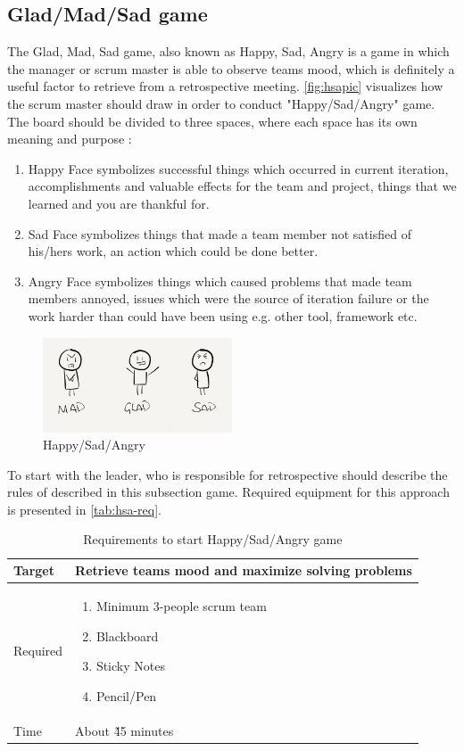 \subsection{Glad/Mad/Sad game}
\label{subch:gmsGame}
The Glad, Mad, Sad game, also known as Happy, Sad, Angry is a game in which the manager or scrum master is able to observe teams mood, which is definitely a useful factor to retrieve from a retrospective meeting. \autoref{fig:hsapic} visualizes how the scrum master should draw in order to conduct "Happy/Sad/Angry" game. The board should be divided to three spaces, where each space has its own meaning and purpose \cite{HSABibliography}:
\begin{enumerate}
    \item Happy Face symbolizes successful things which occurred in current iteration, accomplishments and valuable effects for the team and project, things that we learned and you are thankful for.
    \item Sad Face symbolizes things that made a team member not satisfied of his/hers work, an action which could be done better.
    \item Angry Face symbolizes things which caused problems that made team members annoyed, issues which were the source of iteration failure or the work harder than could have been using e.g. other tool, framework etc.
\end{enumerate}
\begin{figure}[h]
\caption{Happy/Sad/Angry}
\label{fig:hsapic}
\centering
\includegraphics[width=0.5\textwidth]{img/mgs}
\end{figure}

To start with the leader, who is responsible for retrospective should describe the rules of described in this subsection game. Required equipment for this approach is presented in \autoref{tab:hsa-req}.

\begin{table}[h]
	\caption{Requirements to start Happy/Sad/Angry game}
	\label{tab:hsa-req}
	\begin{tabularx}{\textwidth}{|X|X|}
	\hline
		Target & Retrieve teams mood and maximize solving problems  \\ \hline
		Required			& \begin{enumerate}
		    \item Minimum 3-people scrum team
		    \item Blackboard
		    \item Sticky Notes
		    \item Pencil/Pen
		\end{enumerate}	 \\ \hline
		Time			& About \~45 minutes	 \\ \hline

	\end{tabularx}
\end{table}

